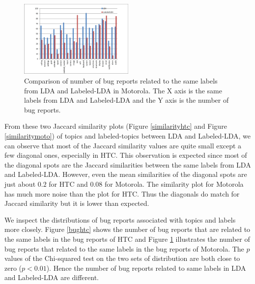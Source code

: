 \documentclass[10pt, conference, compsocconf]{IEEEtran}
\begin{document}
\begin{figure}
\centering
\includegraphics[width=0.5\textwidth]{motoldallda.eps}
\caption{Comparison of number of bug reports related to the same labels from LDA and Labeled-LDA in Motorola. The X axis is the same labels from LDA and Labeled-LDA and the Y axis is the number of bug reports.}
\label{bugmoto}
\end{figure}


From these two Jaccard similarity plots (Figure \ref{similarityhtc}
and Figure \ref{similaritymoto}) of topics and labeled-topics between LDA and
Labeled-LDA, we can observe that most of the Jaccard similarity values
are quite small except a few diagonal ones, especially in HTC. This
observation is expected since most of the diagonal spots are the
Jaccard similarities between the same labels from LDA and
Labeled-LDA. However, even the mean similarities of the diagonal spots
are just about $0.2$ for HTC and $0.08$ for Motorola. The similarity plot
for Motorola has much more noise than the plot for HTC.
Thus the diagonals do match for Jaccard similarity but it is lower
than expected.

We inspect the distributions of bug reports
associated with topics and labels more closely. 
Figure \ref{bughtc} shows the number of bug reports that are related to
the same labels in the bug reports of HTC and Figure \ref{bugmoto}
illustrates the number of bug reports that related to the same labels
in the bug reports of Motorola. The $ p $ values of the Chi-squared
test on the two sets of distribution are both close to zero ($p < 0.01$). Hence the
number of bug reports related to same labels in LDA and Labeled-LDA
are different.


\end{document}
